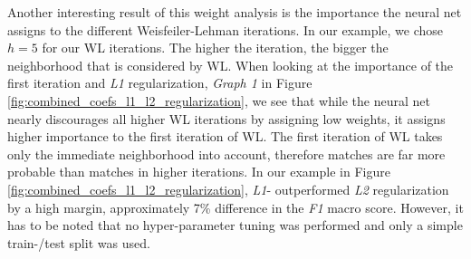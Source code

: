 Another interesting result of this weight analysis is the importance the neural net assigns to the different Weisfeiler-Lehman iterations. In our example, we chose $h = 5$ for our WL iterations. The higher the iteration, the bigger the neighborhood that is considered by WL.
When looking at the importance of the first iteration and \textit{L1} regularization, \textit{Graph 1} in Figure \ref{fig:combined_coefs_l1_l2_regularization}, we see that while the neural net nearly discourages all higher WL iterations by assigning low weights, it assigns higher importance to the first iteration of WL.
The first iteration of WL takes only the immediate neighborhood into account, therefore matches are far more probable than matches in higher iterations.
In our example in Figure \ref{fig:combined_coefs_l1_l2_regularization}, \textit{L1}- outperformed \textit{L2} regularization by a high margin, approximately 7\% difference in the \textit{F1} macro score.
However, it has to be noted that no hyper-parameter tuning was performed and only a simple train-/test split was used.

